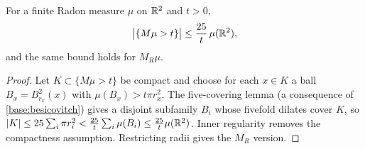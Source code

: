 \begin{lemma}\label{lem:maximal}
For a finite Radon measure $\mu$ on $\mathbb R^2$ and $t>0$,
\begin{equation}\label{eq:maximal}
  \bigl|\{M\mu>t\}\bigr|\le\frac{25}{t}\,\mu(\mathbb R^2),
\end{equation}
and the same bound holds for $M_R\mu$.
\end{lemma}

\begin{proof}
Let $K\subset\{M\mu>t\}$ be compact and choose for each $x\in K$ a ball
$B_x=B_{r_x}^2(x)$ with $\mu(B_x)>t\pi r_x^2$.  The five-covering lemma
(a consequence of \ref{base:besicovitch}) gives a disjoint subfamily $B_i$
whose fivefold dilates cover $K$, so
$|K|\le25\sum_i\pi r_i^2<\frac{25}{t}\sum_i\mu(B_i)\le\frac{25}{t}\mu(\mathbb R^2)$.
Inner regularity removes the compactness assumption.  Restricting radii gives
the $M_R$ version.
\end{proof}

